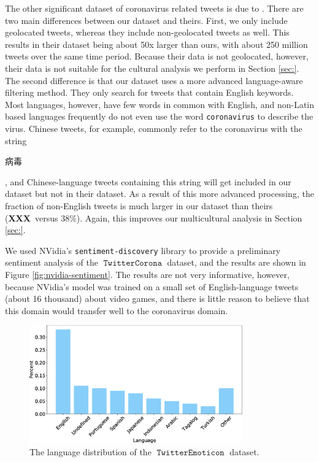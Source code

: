 \documentclass[11pt]{article}
\newcommand{\XXX}{\textbf{XXX}~}
\DeclareMathOperator{\emoticon}{\texttt{TwitterEmoticon}}
\DeclareMathOperator{\corona}{\texttt{TwitterCorona}}
\begin{document}
The other significant dataset of coronavirus related tweets is due to \citet{chen2020tracking}.
There are two main differences between our dataset and theirs.
First, we only include geolocated tweets,
whereas they include non-geolocated tweets as well.
This results in their dataset being about 50x larger than ours,
with about 250 million tweets over the same time period.
Because their data is not geolocated, however, their data is not suitable for the cultural analysis we perform in Section \ref{sec:}.
The second difference is that our dataset uses a more advanced language-aware filtering method.
They only search for tweets that contain English keywords.
Most languages, however, have few words in common with English,
and non-Latin based languages frequently do not even use the word \texttt{coronavirus} to describe the virus.
Chinese tweets, for example, commonly refer to the coronavirus with the string
\begin{CJK}{UTF8}{gbsn}
病毒
\end{CJK},
and Chinese-language tweets containing this string will get included in our dataset but not in their dataset.
As a result of this more advanced processing, the fraction of non-English tweets is much larger in our dataset than theirs (\XXX versus 38\%).
Again, this improves our multicultural analysis in Section \ref{sec:}.

We used NVidia's \texttt{sentiment-discovery} library to provide a preliminary sentiment analysis of the $\corona$ dataset,
and the results are shown in Figure \ref{fig:nvidia-sentiment}.
The results are not very informative, however, because NVidia's model was trained on a small set of English-language tweets (about 16 thousand) about video games,
and there is little reason to believe that this domain would transfer well to the coronavirus domain.

\begin{figure}
    \centering
    \includegraphics[height=2in]{images/dis_lang.eps}
    \caption{The language distribution of the $\emoticon$ dataset.} 
    \label{table:lang}
\end{figure}
\end{document}
